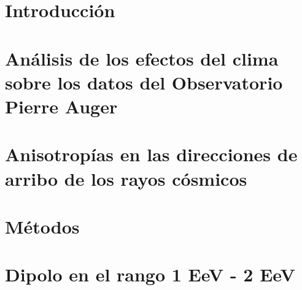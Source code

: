 \documentclass[12pt,papel,oneside]{ibtesis}
\begin{document}
	\graphicspath{{../IntroduccionBachelor/}}
	
	
	\graphicspath{{../IntroduccionAuger/}}
	

	\chapter{Introducción}
	\graphicspath{{../0_Introduccion/}}
	
	

 \chapter{Análisis de los efectos del clima sobre los datos del Observatorio Pierre Auger}
	\graphicspath{{../Clima/}}
	
	

\chapter{Anisotropías en las direcciones de arribo de los rayos cósmicos}
	\graphicspath{{../Anisotropia/}}
	
	

\chapter{Métodos}
	\graphicspath{{../1_Metodo/}}
	
	
	
\chapter{Dipolo en el rango 1 EeV - 2 EeV}
	\graphicspath{{../6_Dipole_1-2_EeV/}}
	


	\graphicspath{{../report_16_EW_PDF_IB_style/}}

	

	

	

	


% 

\begin{biblio}
	
\end{biblio}
\end{document}

